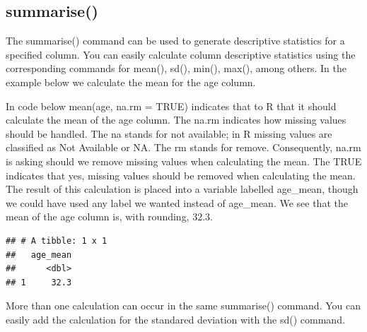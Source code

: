 \documentclass[
]{krantz}
\makeatletter
\newenvironment{Shaded}{\begin{snugshade}}{\end{snugshade}}
\newcommand{\DataTypeTok}[1]{\textcolor[rgb]{0.27,0.27,0.27}{#1}}
\newcommand{\KeywordTok}[1]{\textcolor[rgb]{0.27,0.27,0.27}{\textbf{#1}}}
\newcommand{\NormalTok}[1]{#1}
\newcommand{\OperatorTok}[1]{\textcolor[rgb]{0.43,0.43,0.43}{\textbf{#1}}}
\newcommand{\OtherTok}[1]{\textcolor[rgb]{0.37,0.37,0.37}{#1}}
\newcommand{\StringTok}[1]{\textcolor[rgb]{0.5,0.5,0.5}{#1}}
\newenvironment{kframe}{%
\medskip{}
\setlength{\fboxsep}{.8em}
 \def\at@end@of@kframe{}%
 \ifinner\ifhmode%
  \def\at@end@of@kframe{\end{minipage}}%
  \begin{minipage}{\columnwidth}%
 \fi\fi%
 \def\FrameCommand##1{\hskip\@totalleftmargin \hskip-\fboxsep
 \colorbox{shadecolor}{##1}\hskip-\fboxsep
     \hskip-\linewidth \hskip-\@totalleftmargin \hskip\columnwidth}%
 \MakeFramed {\advance\hsize-\width
   \@totalleftmargin\z@ \linewidth\hsize
   \@setminipage}}%
 {\par\unskip\endMakeFramed%
 \at@end@of@kframe}
\renewenvironment{Shaded}{\begin{kframe}}{\end{kframe}}
\makeatother
\begin{document}
\hypertarget{summarise}{%
\subsection{summarise()}\label{summarise}}

The summarise() command can be used to generate descriptive statistics for a specified column. You can easily calculate column descriptive statistics using the corresponding commands for mean(), sd(), min(), max(), among others. In the example below we calculate the mean for the age column.

In code below mean(age, na.rm = TRUE) indicates that to R that it should calculate the mean of the age column. The na.rm indicates how missing values should be handled. The na stands for not available; in R missing values are classified as Not Available or NA. The rm stands for remove. Consequently, na.rm is asking should we remove missing values when calculating the mean. The TRUE indicates that yes, missing values should be removed when calculating the mean. The result of this calculation is placed into a variable labelled age\_mean, though we could have used any label we wanted instead of age\_mean. We see that the mean of the age column is, with rounding, 32.3.

\begin{Shaded}
\end{Shaded}

\begin{verbatim}
## # A tibble: 1 x 1
##   age_mean
##      <dbl>
## 1     32.3
\end{verbatim}

More than one calculation can occur in the same summarise() command. You can easily add the calculation for the standared deviation with the sd() command.

\begin{Shaded}
\end{Shaded}
\end{document}
